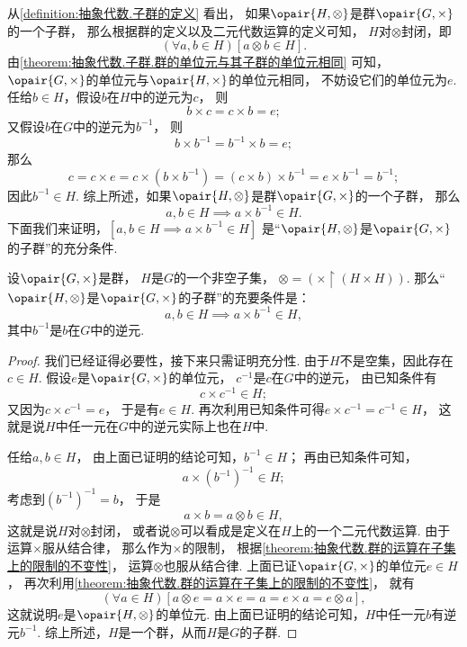 从\cref{definition:抽象代数.子群的定义} 看出，
如果\(\opair{H,\otimes}\)是群\(\opair{G,\times}\)的一个子群，
那么根据群的定义以及二元代数运算的定义可知，
\(H\)对\(\otimes\)封闭，即\[
	(\forall a,b \in H)[a \otimes b \in H].
\]
由\cref{theorem:抽象代数.子群.群的单位元与其子群的单位元相同} 可知，
\(\opair{G,\times}\)的单位元与\(\opair{H,\times}\)的单位元相同，
不妨设它们的单位元为\(e\).
任给\(b \in H\)，假设\(b\)在\(H\)中的逆元为\(c\)，
则\[
	b \times c = c \times b = e;
\]
又假设\(b\)在\(G\)中的逆元为\(b^{-1}\)，
则\[
	b \times b^{-1} = b^{-1} \times b = e;
\]
那么\[
	c = c \times e
	= c \times (b \times b^{-1})
	= (c \times b) \times b^{-1}
	= e \times b^{-1}
	= b^{-1};
\]
因此\(b^{-1} \in H\).
综上所述，如果\(\opair{H,\otimes}\)是群\(\opair{G,\times}\)的一个子群，
那么\[
	a,b \in H
	\implies
	a \times b^{-1} \in H.
\]
下面我们来证明，\([a,b \in H \implies a \times b^{-1} \in H]\)
是“\(\opair{H,\otimes}\)是\(\opair{G,\times}\)的子群”的充分条件.
\begin{theorem}
设\(\opair{G,\times}\)是群，
\(H\)是\(G\)的一个非空子集，
\(\otimes = (\times \upharpoonright(H \times H))\).
那么“\(\opair{H,\otimes}\)是\(\opair{G,\times}\)的子群”的充要条件是：\[
	a,b \in H \implies a \times b^{-1} \in H,
\]
其中\(b^{-1}\)是\(b\)在\(G\)中的逆元.
\begin{proof}
我们已经证得必要性，接下来只需证明充分性.
由于\(H\)不是空集，因此存在\(c \in H\).
假设\(e\)是\(\opair{G,\times}\)的单位元，
\(c^{-1}\)是\(c\)在\(G\)中的逆元，
由已知条件有\[
	c \times c^{-1} \in H;
\]
又因为\(c \times c^{-1} = e\)，
于是有\(e \in H\).
再次利用已知条件可得\(e \times c^{-1} = c^{-1} \in H\)，
这就是说\(H\)中任一元在\(G\)中的逆元实际上也在\(H\)中.

任给\(a,b \in H\)，
由上面已证明的结论可知，\(b^{-1} \in H\)；
再由已知条件可知，\[
	a \times (b^{-1})^{-1} \in H;
\]
考虑到\((b^{-1})^{-1} = b\)，
于是\[
	a \times b = a \otimes b \in H,
\]
这就是说\(H\)对\(\otimes\)封闭，
或者说\(\otimes\)可以看成是定义在\(H\)上的一个二元代数运算.
由于运算\(\times\)服从结合律，
那么作为\(\times\)的限制，
根据\cref{theorem:抽象代数.群的运算在子集上的限制的不变性}，
运算\(\otimes\)也服从结合律.
上面已证\(\opair{G,\times}\)的单位元\(e \in H\)，
再次利用\cref{theorem:抽象代数.群的运算在子集上的限制的不变性}，
就有\[
	(\forall a \in H)[
		a \otimes e = a \times e = a = e \times a = e \otimes a
	],
\]
这就说明\(e\)是\(\opair{H,\otimes}\)的单位元.
由上面已证明的结论可知，\(H\)中任一元\(b\)有逆元\(b^{-1}\).
综上所述，\(H\)是一个群，从而\(H\)是\(G\)的子群.
\end{proof}
\end{theorem}

